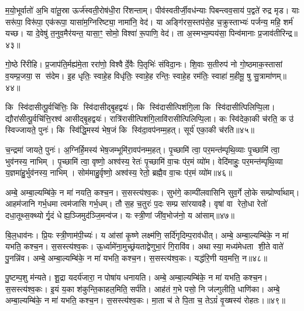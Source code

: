 {\anuvakamend[{नम॒ एका॒न्नत्रि॒ꣳ॒शत्॥16॥}]}

म॒यो॒भूर्वातो॑ अ॒भि वा॑तू॒स्रा ऊर्ज॑स्वती॒रोष॑धी॒रा रि॑शन्ताम्। पीव॑स्वतीर्जी॒वध॑न्याः पिबन्त्वव॒साय॑ प॒द्वते॑ रुद्र मृड। याः सरू॑पा॒ विरू॑पा॒ एक॑रूपा॒ यासा॑म॒ग्निरिष्ट्या॒ नामा॑नि॒ वेद॑। या अङ्गि॑रस॒स्तप॑से॒ह च॒क्रुस्ताभ्यः॑ पर्जन्य॒ महि॒ शर्म॑ यच्छ। या दे॒वेषु॑ त॒नुव॒मैर॑यन्त॒ यासा॒ꣳ॒ सोमो॒ विश्वा॑ रू॒पाणि॒ वेद॑। ता अ॒स्मभ्य॒म्पय॑सा॒ पिन्व॑मानाः प्र॒जाव॑तीरिन्द्र॥४३॥

गो॒ष्ठे रि॑रीहि। प्र॒जाप॑ति॒र्मह्य॑मे॒ता ररा॑णो॒ विश्वैर्दे॒वैः पि॒तृभिः॑ संविदा॒नः। शि॒वाः स॒तीरुप॑ नो गो॒ष्ठमाक॒स्तासां व॒यम्प्र॒जया॒ स स॑देम। इ॒ह धृतिः॒ स्वाहे॒ह विधृ॑तिः॒ स्वाहे॒ह रन्तिः॒ स्वाहे॒ह रम॑तिः॒ स्वाहा॑ म॒हीमू॒ षु सु॒त्रामा॑णम्॥४४॥

{\anuvakamend[{इ॒न्द्रा॒ष्टात्रिꣳ॑शच्च॥17॥}]}

कि स्वि॑दासीत्पू॒र्वचि॑त्तिः॒ कि स्वि॑दासीद्बृ॒हद्वयः॑। कि स्वि॑दासीत्पिशंगि॒ला कि स्वि॑दासीत्पिलिप्पि॒ला। द्यौरा॑सीत्पू॒र्वचि॑त्ति॒रश्व॑ आसीद्बृ॒हद्वयः॑। रात्रि॑रासीत्पिशंगि॒लावि॑रासीत्पिलिप्पि॒ला। कः स्वि॑देका॒की च॑रति॒ क उ॑ स्विज्जायते॒ पुनः॑। कि स्वि॑द्धि॒मस्य॑ भेष॒जं कि स्वि॑दा॒वप॑नम्म॒हत्। सूर्य॑ एका॒की च॑रति॥४५॥

च॒न्द्रमा॑ जायते॒ पुनः॑। अ॒ग्निर्\mbox{}हि॒मस्य॑ भेष॒जम्भूमि॑रा॒वप॑नम्म॒हत्। पृ॒च्छामि॑ त्वा॒ पर॒मन्त॑म्पृथि॒व्याः पृ॒च्छामि॑ त्वा॒ भुव॑नस्य॒ नाभिम्। पृ॒च्छामि॑ त्वा॒ वृष्णो॒ अश्व॑स्य॒ रेतः॑ पृ॒च्छामि॑ वा॒चः प॑र॒मं व्यो॑म। वेदि॑माहुः॒ पर॒मन्त॑म्पृथि॒व्या य॒ज्ञमा॑हु॒र्भुव॑नस्य॒ नाभिम्। सोम॑माहु॒र्वृष्णो॒ अश्व॑स्य॒ रेतो॒ ब्रह्मै॒व वा॒चः प॑र॒मं व्यो॑म॥४६॥

{\anuvakamend[{सूर्य॑ एका॒की च॑रति॒ षट्च॑त्वारिशच्च॥18॥}]}

अम्बे॒ अम्बा॒ल्यम्बि॑के॒ न मा॑ नयति॒ कश्च॒न। स॒सस्त्य॑श्व॒कः। सुभ॑गे॒ काम्पी॑लवासिनि सुव॒र्गे लो॒के सम्प्रोर्ण्वा॑थाम्। आहम॑जानि गर्भ॒धमा त्वम॑जासि गर्भ॒धम्। तौ स॒ह च॒तुरः॑ प॒दः सम्प्र सा॑रयावहै। वृषा॑ वा रेतो॒धा रेतो॑ दधा॒तूथ्स॒क्थ्योर्गृ॒दं धेह्य॒ञ्जिमुद॑ञ्जि॒मन्व॑ज। यः स्त्री॒णां जी॑व॒भोज॑नो॒ य आ॑साम्॥४७॥

बि॒ल॒धाव॑नः। प्रि॒यः स्त्री॒णाम॑पी॒च्यः॑। य आ॑सां कृ॒ष्णे लक्ष्म॑णि॒ सर्दि॑गृदिम्प॒राव॑धीत्। अम्बे॒ अम्बा॒ल्यम्बि॑के॒ न मा॑ यभति॒ कश्च॒न। स॒सस्त्य॑श्व॒कः। ऊ॒र्ध्वामे॑ना॒मुच्छ्र॑यताद्वेणुभा॒रं गि॒रावि॑व। अथास्या॒ मध्य॑मेधता शी॒ते वाते॑ पु॒नन्नि॑व। अम्बे॒ अम्बा॒ल्यम्बि॑के॒ न मा॑ यभति॒ कश्च॒न। स॒सस्त्य॑श्व॒कः। यद्ध॑रि॒णी यव॒मत्ति॒ न॥४८॥

पु॒ष्टम्प॒शु म॑न्यते। शू॒द्रा यदर्य॑जारा॒ न पोषा॑य धनायति। अम्बे॒ अम्बा॒ल्यम्बि॑के॒ न मा॑ यभति॒ कश्च॒न। स॒सस्त्य॑श्व॒कः। इ॒यं य॒का श॑कुन्ति॒काहल॒मिति॒ सर्प॑ति। आह॑तं ग॒भे पसो॒ नि ज॑ल्गुलीति॒ धाणि॑का। अम्बे॒ अम्बा॒ल्यम्बि॑के॒ न मा॑ यभति॒ कश्च॒न। स॒सस्त्य॑श्व॒कः। मा॒ता च॑ ते पि॒ता च॒ तेऽग्रं॑ वृ॒ख्षस्य॑ रोहतः।॥४९॥

